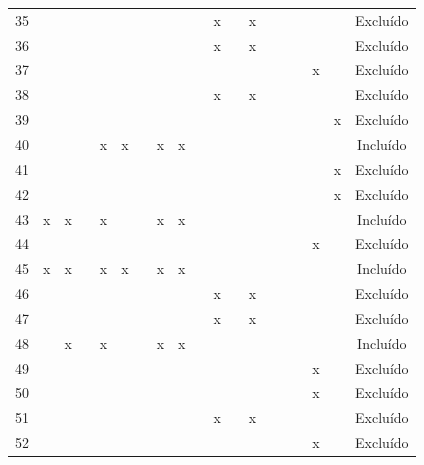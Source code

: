 \documentclass[
	12pt,				%
	oneside,			%
	a4paper,			%
	english,			%
	brazil				%
	]{abntex2ppgsi}
\begin{document}
\begin{apendicesenv}
\begin{table}[H]
\begin{tabular}{c | c c c c c c c c | c c c c c c c c c | c}
35 &   &   &   &   &   &   &   &   &   & x &   & x &   &   &   &   &   & Excluído \\
36 &   &   &   &   &   &   &   &   &   & x &   & x &   &   &   &   &   & Excluído \\
37 &   &   &   &   &   &   &   &   &   &   &   &   &   &   &   & x &   & Excluído \\
38 &   &   &   &   &   &   &   &   &   & x &   & x &   &   &   &   &   & Excluído \\
39 &   &   &   &   &   &   &   &   &   &   &   &   &   &   &   &   & x & Excluído \\
40 &   &   &   & x & x &   & x & x &   &   &   &   &   &   &   &   &   & Incluído \\
41 &   &   &   &   &   &   &   &   &   &   &   &   &   &   &   &   & x & Excluído \\
42 &   &   &   &   &   &   &   &   &   &   &   &   &   &   &   &   & x & Excluído \\
43 & x & x &   & x &   &   & x & x &   &   &   &   &   &   &   &   &   & Incluído \\
44 &   &   &   &   &   &   &   &   &   &   &   &   &   &   &   & x &   & Excluído \\
45 & x & x &   & x & x &   & x & x &   &   &   &   &   &   &   &   &   & Incluído \\
46 &   &   &   &   &   &   &   &   &   & x &   & x &   &   &   &   &   & Excluído \\
47 &   &   &   &   &   &   &   &   &   & x &   & x &   &   &   &   &   & Excluído \\
48 &   & x &   & x &   &   & x & x &   &   &   &   &   &   &   &   &   & Incluído \\
49 &   &   &   &   &   &   &   &   &   &   &   &   &   &   &   & x &   & Excluído \\
50 &   &   &   &   &   &   &   &   &   &   &   &   &   &   &   & x &   & Excluído \\
51 &   &   &   &   &   &   &   &   &   & x &   & x &   &   &   &   &   & Excluído \\
52 &   &   &   &   &   &   &   &   &   &   &   &   &   &   &   & x &   & Excluído \\
\bottomrule
\end{tabular}
\end{table}



\end{apendicesenv}
\end{document}
